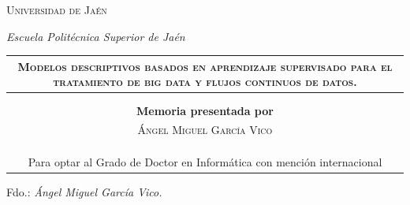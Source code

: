 \documentclass[c5paper,10pt,twoside]{book}	   	%
\newcommand{\doubleline}{\midrule \midrule}
\def\autor{Ángel Miguel García Vico}
\def\titulo{Modelos descriptivos basados en aprendizaje supervisado para el tratamiento de big data y flujos continuos de datos}
\def\universidad{Universidad de Jaén}
\def\centro{Escuela Politécnica Superior de Jaén}
\begin{document}
\clearpage{}



\pagestyle{empty}



\begin{titlepage}
	\begin{center}
		\Huge{\textsc{\universidad}}
		
		\Large{\textit{\centro}}
		
		\bigskip
		\bigskip
		\bigskip
		\bigskip
		
		\begin{tabulary}{\textwidth}{C}
			\doubleline
			\Large{\textsc{\textbf{\titulo.}}} \\
			\doubleline \\ \\
			\textbf{\Large{Memoria presentada por}} \\
			\LARGE{\textsc{\autor}}
			\\
			\\
			\\
			\\
			\Large{Para optar al Grado de Doctor en Informática \linebreak con \sc mención internacional}
		\end{tabulary}
	
	\vspace{\fill}
	
	\large{Fdo.: \sl{\autor.}}
		
	\end{center}
\end{titlepage}







\cleardoublepage

\mbox{}
\vfill
\begin{figure}[!hbtp]
	\centering
\end{figure}
\end{document}
